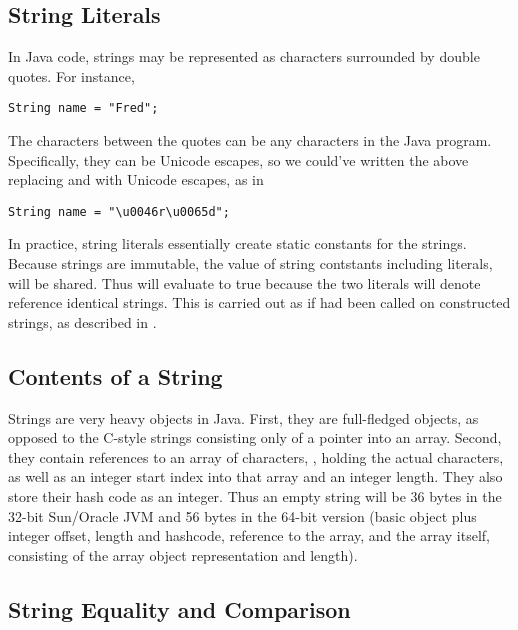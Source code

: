 \subsection{String Literals}

In Java code, strings may be represented as characters surrounded
by double quotes.  For instance,
%
\begin{verbatim}
String name = "Fred";
\end{verbatim}
%
The characters between the quotes can be any characters in the Java
program.  Specifically, they can be Unicode escapes, so we could've
written the above replacing  and  with Unicode
escapes, as in
%
\begin{verbatim}
String name = "\u0046r\u0065d";
\end{verbatim}

In practice, string literals essentially create static constants for
the strings.  Because strings are immutable, the value of string
contstants including literals, will be shared.  Thus  will evaluate to true because the two literals will denote
reference identical strings.  This is carried out as if
 had been called on constructed strings, as described
in .


\subsection{Contents of a String}

Strings are very heavy objects in Java.  First, they are full-fledged
objects, as opposed to the C-style strings consisting only of a
pointer into an array.  Second, they contain references to an array of
characters, , holding the actual characters, as well as
an integer start index into that array and an integer length.  They
also store their hash code as an integer.  Thus an empty string will
be 36 bytes in the 32-bit Sun/Oracle JVM and 56 bytes in the 64-bit
version (basic object plus integer offset, length and hashcode,
reference to the array, and the array itself, consisting of the array
object representation and length).


\subsection{String Equality and Comparison}

